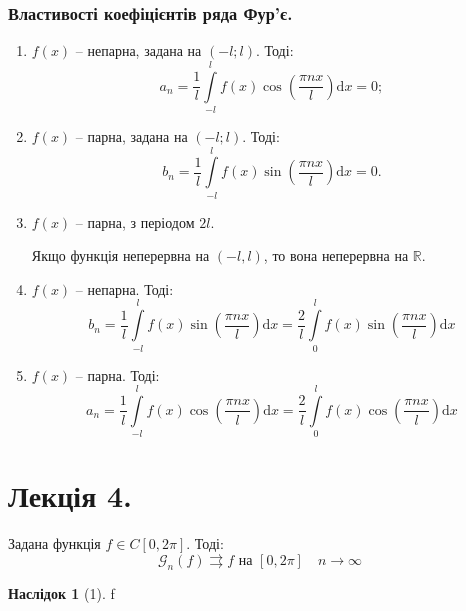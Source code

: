 \documentclass[a4paper]{scrartcl}
\theoremstyle{definition}
\theoremstyle{remark}
\theoremstyle{definition}
\newtheorem*{consequence}{Наслідок}
\theoremstyle{definition}
\def\i{\infty}                 %
\begin{document}
\subsubsection*{Властивості коефіцієнтів ряда Фур'є.}
\begin{enumerate}
  \item $f(x)$ -- непарна, задана на $(-l; l)$. Тоді:
  $$
  a_n = \frac{1}{l}  \int\limits_{-l}^{ l}{
  f(x) \cos{( \frac{\pi n x}{l} )} \mathrm{d} x
  } = 0 ;
  $$
  \item $f(x)$ -- парна, задана на $(-l; l)$. Тоді:
  $$
  b_n = \frac{1}{l}  \int\limits_{-l}^{ l}{
  f(x) \sin{( \frac{\pi n x}{l} ) } \mathrm{d} x
  }  = 0.
  $$
  \item $f(x)$ -- парна, з періодом $2l$. \par
  Якщо функція неперервна на $(-l, l)$, то вона неперервна на $\mathbb{R}$.
  \item $f(x)$ -- непарна. Тоді:
  $$
  b_n = \frac{1}{l}  \int\limits_{-l}^{ l}{
  f(x) \sin{( \frac{\pi n x}{l} ) } \mathrm{d} x
  }  = \frac{2}{l}  \int\limits_{0}^{ l}{
  f(x) \sin{( \frac{\pi n x}{l} ) } \mathrm{d} x
  } $$
  \item $f(x)$ -- парна. Тоді:
  $$
  a_n = \frac{1}{l}  \int\limits_{-l}^{ l}{
  f(x) \cos{( \frac{\pi n x}{l} ) } \mathrm{d} x
  }  = \frac{2}{l}  \int\limits_{0}^{ l}{
  f(x) \cos{( \frac{\pi n x}{l} ) } \mathrm{d} x
  }
  $$
\end{enumerate}
\newpage
\section{Лекція 4.}
\begin{boxteo}[Фейера]
Задана функція \( f  \in C[0, 2\pi]\). Тоді:
\[
 \mathcal{G}_n (f) \rightrightarrows f  \text{ на } [0, 2\pi] \quad n \to \i
\]
\end{boxteo}
\begin{consequence}[1]
  f \in 
\end{consequence}
\end{document}
